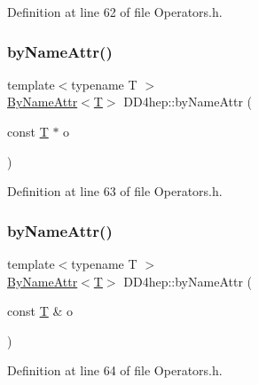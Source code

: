 Definition at line 62 of file Operators.\+h.

\hypertarget{namespace_d_d4hep_a04aa67318f31c6bb25db5fc2a2df1db4}{}\label{namespace_d_d4hep_a04aa67318f31c6bb25db5fc2a2df1db4} 
\subsubsection{\texorpdfstring{by\+Name\+Attr()}{byNameAttr()}\hspace{0.1cm}{\footnotesize\ttfamily [2/3]}}
{\footnotesize\ttfamily template$<$typename T $>$ \\
\hyperlink{class_d_d4hep_1_1_by_name_attr}{By\+Name\+Attr}$<$\hyperlink{class_t}{T}$>$ D\+D4hep\+::by\+Name\+Attr (\begin{DoxyParamCaption}\item[{const \hyperlink{class_t}{T} $\ast$}]{o }\end{DoxyParamCaption})}



Definition at line 63 of file Operators.\+h.

\hypertarget{namespace_d_d4hep_a53223685e92ed963db697b1dca02cca8}{}\label{namespace_d_d4hep_a53223685e92ed963db697b1dca02cca8} 
\subsubsection{\texorpdfstring{by\+Name\+Attr()}{byNameAttr()}\hspace{0.1cm}{\footnotesize\ttfamily [3/3]}}
{\footnotesize\ttfamily template$<$typename T $>$ \\
\hyperlink{class_d_d4hep_1_1_by_name_attr}{By\+Name\+Attr}$<$\hyperlink{class_t}{T}$>$ D\+D4hep\+::by\+Name\+Attr (\begin{DoxyParamCaption}\item[{const \hyperlink{class_t}{T} \&}]{o }\end{DoxyParamCaption})}



Definition at line 64 of file Operators.\+h.

\hypertarget{namespace_d_d4hep_ac43b4e908a07dd4d419396751191c52c}{}\label{namespace_d_d4hep_ac43b4e908a07dd4d419396751191c52c} 
